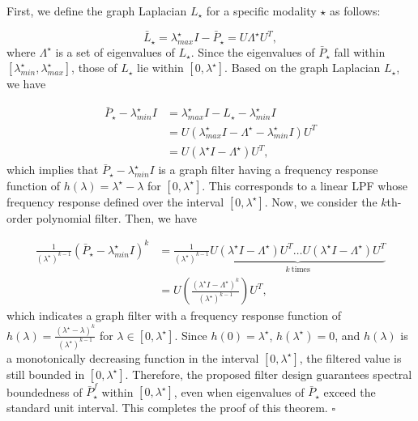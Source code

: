 \documentclass[a4paper,fleqn]{cas-sc}
\begin{document}
\begin{pf}
    First, we define the graph Laplacian $L_\star$ for a specific modality $\star$ as follows:

    \begin{equation}
        \bar L_\star = \lambda_{max}^\star I - \bar P_\star = U\Lambda^\star U^T,
    \end{equation}
    where $\Lambda^\star$ is a set of eigenvalues of $L_\star$. Since the eigenvalues of $\bar P_\star$ fall within $[\lambda_{min}^\star, \lambda_{max}^\star]$, those of $L_\star$ lie within $[0, \lambda^\star]$. Based on the graph Laplacian $L_\star$, we have

    \begin{equation}
        \begin{aligned}
            \bar P_\star - \lambda^\star_{min}I &= \lambda^\star_{max}I-L_\star - \lambda^\star_{min}I \\ &= U(\lambda^\star_{max}I - \Lambda^\star - \lambda^\star_{min}I)U^T \\ &= U(\lambda^\star I -\Lambda^\star)U^T,
        \end{aligned}
    \end{equation}
    which implies that $\bar P_\star - \lambda^\star_{min}I$ is a graph filter having a frequency response function of $h(\lambda)=\lambda^\star-\lambda$ for $[0, \lambda^\star]$. This corresponds to a linear LPF whose frequency response defined over the interval $[0,\lambda^\star]$. Now, we consider the $k$th-order polynomial filter. Then, we have

    \begin{equation}
        \begin{aligned}
            \frac{1}{(\lambda^\star)^{k-1}}(\bar P_\star-\lambda^\star_{min}I)^k &=\frac{1}{(\lambda^\star)^{k-1}} \underbrace {U (\lambda^\star I-\Lambda^\star) U^T \dots U(\lambda^\star I-\Lambda^\star) U^T}_{k\ \text{times}} \\&=U\left( \frac{(\lambda^\star I -\Lambda^\star)^k}{(\lambda^\star)^{k-1}} \right) U^T,
        \end{aligned}
    \end{equation}
    which indicates a graph filter with a frequency response function of $h(\lambda) = \frac{(\lambda^\star - \lambda)^k}{(\lambda^\star)^{k-1}}$ for $\lambda\in[0, \lambda^\star]$. Since $h(0) = \lambda^\star$, $h(\lambda^\star)=0$, and $h(\lambda)$ is a monotonically decreasing function in the interval $[0, \lambda^\star]$, the filtered value is still bounded in $[0,\lambda^\star]$. Therefore, the proposed filter design guarantees spectral boundedness of $\bar{P}_\star^f$ within $[0, \lambda^\star]$, even when eigenvalues of $\bar{P}_\star$ exceed the standard unit interval. This completes the proof of this theorem.
    \hfill $\square$
\end{pf}
\end{document}
